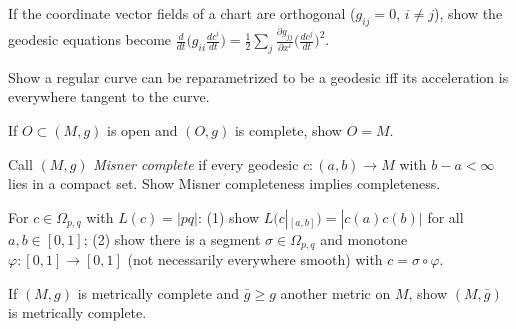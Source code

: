 \begin{remark}
  \label{rem:pet-ch5-ex-3}
  If the coordinate vector fields of a chart are orthogonal ($g_{ij}=0$, $i\ne j$),
  show the geodesic equations become
  $\frac{d}{dt}\big(g_{ii}\frac{dc^i}{dt}\big)=\frac12\sum_j\frac{\partial g_{jj}}
  {\partial x^i}\big(\frac{dc^j}{dt}\big)^2$.
\end{remark}

\begin{remark}
  \label{rem:pet-ch5-ex-4}
  Show a regular curve can be reparametrized to be a geodesic iff its acceleration
  is everywhere tangent to the curve.
\end{remark}

\begin{remark}
  \label{rem:pet-ch5-ex-5}
  If $O\subset(M,g)$ is open and $(O,g)$ is complete, show $O=M$.
\end{remark}

\begin{remark}
  \label{rem:pet-ch5-ex-6}
  Call $(M,g)$ \emph{Misner complete} if every geodesic $c:(a,b)\to M$ with
  $b-a<\infty$ lies in a compact set. Show Misner completeness implies
  completeness.
\end{remark}

\begin{remark}
  \label{rem:pet-ch5-ex-7}
  For $c\in\Omega_{p,q}$ with $L(c)=|pq|$: (1) show $L(c|_{[a,b]})=|c(a)c(b)|$ for
  all $a,b\in[0,1]$; (2) show there is a segment $\sigma\in\Omega_{p,q}$ and
  monotone $\varphi:[0,1]\to[0,1]$ (not necessarily everywhere smooth) with
  $c=\sigma\circ\varphi$.
\end{remark}

\begin{remark}
  \label{rem:pet-ch5-ex-8}
  If $(M,g)$ is metrically complete and $\bar g\ge g$ another metric on $M$, show
  $(M,\bar g)$ is metrically complete.
\end{remark}


